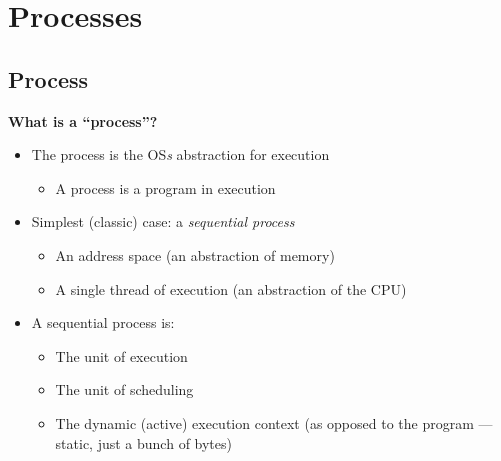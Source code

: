 \documentclass[11pt,a4paper]{article}
\begin{document}
\break{}

\section{Processes}

\subsection{Process}

\textbf{What is a ``process''?}
\begin{itemize}
    \item The process is the OS\emph{s} abstraction for execution
        \begin{itemize}
            \item A process is a program in execution
        \end{itemize}
    \item Simplest (classic) case: a \emph{sequential process}
        \begin{itemize}
            \item An address space (an abstraction of memory)
            \item A single thread of execution (an abstraction of the CPU)
        \end{itemize}
    \item A sequential process is:
        \begin{itemize}
            \item The unit of execution
            \item The unit of scheduling
            \item The dynamic (active) execution context
                (as opposed to the program --- static, just a bunch of bytes)
        \end{itemize}

\end{itemize}
\end{document}
